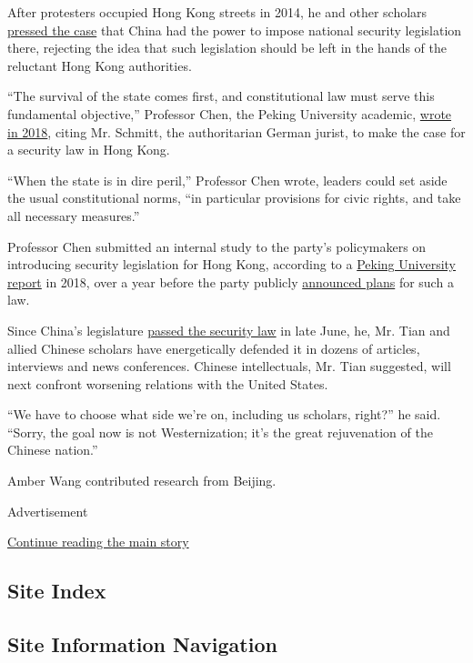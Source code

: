 After protesters occupied Hong Kong streets in 2014, he and other
scholars \href{https://opinion.huanqiu.com/article/9CaKrnJGSZs}{pressed
the case} that China had the power to impose national security
legislation there, rejecting the idea that such legislation should be
left in the hands of the reluctant Hong Kong authorities.

``The survival of the state comes first, and constitutional law must
serve this fundamental objective,'' Professor Chen, the Peking
University academic,
\href{http://hk.zijing.org/2018/0122/750657.shtml}{wrote in 2018},
citing Mr. Schmitt, the authoritarian German jurist, to make the case
for a security law in Hong Kong.

``When the state is in dire peril,'' Professor Chen wrote, leaders could
set aside the usual constitutional norms, ``in particular provisions for
civic rights, and take all necessary measures.''

Professor Chen submitted an internal study to the party's policymakers
on introducing security legislation for Hong Kong, according to a
\href{http://www.publiclaw.cn/static/upfile/201807251034548539.pdf}{Peking
University report} in 2018, over a year before the party publicly
\href{https://www.nytimes.com/2019/10/31/world/asia/hong-kong-protests-china.html}{announced
plans} for such a law.

Since China's legislature
\href{https://www.nytimes.com/2020/06/29/world/asia/china-hong-kong-security-law-rules.html}{passed
the security law} in late June, he, Mr. Tian and allied Chinese scholars
have energetically defended it in dozens of articles, interviews and
news conferences. Chinese intellectuals, Mr. Tian suggested, will next
confront worsening relations with the United States.

``We have to choose what side we're on, including us scholars, right?''
he said. ``Sorry, the goal now is not Westernization; it's the great
rejuvenation of the Chinese nation.''

Amber Wang contributed research from Beijing.

Advertisement

\protect\hyperlink{after-bottom}{Continue reading the main story}

\hypertarget{site-index}{%
\subsection{Site Index}\label{site-index}}

\hypertarget{site-information-navigation}{%
\subsection{Site Information
Navigation}\label{site-information-navigation}}

